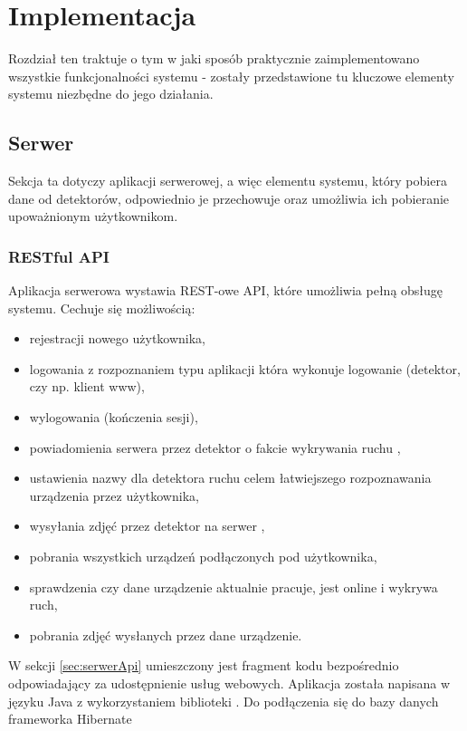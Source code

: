 \chapter{Implementacja}
\label{cha:implementacja}

Rozdział ten traktuje o tym w jaki sposób praktycznie zaimplementowano wszystkie funkcjonalności systemu - zostały przedstawione tu kluczowe elementy systemu niezbędne do jego działania. 

\section{Serwer}
\label{sec:serwer}

Sekcja ta dotyczy aplikacji serwerowej, a więc elementu systemu, który pobiera dane od detektorów, odpowiednio je przechowuje oraz umożliwia ich pobieranie upoważnionym użytkownikom.

\subsection{RESTful API}
\label{sec:api}

Aplikacja serwerowa wystawia REST-owe API, które umożliwia pełną obsługę systemu. Cechuje się możliwością:

\begin{itemize}
	\item rejestracji nowego użytkownika,
	\item logowania z rozpoznaniem typu aplikacji która wykonuje logowanie (detektor, czy np. klient www),
	\item wylogowania (kończenia sesji),
	\item powiadomienia serwera przez detektor o fakcie wykrywania ruchu ,
	\item ustawienia nazwy dla detektora ruchu celem łatwiejszego rozpoznawania urządzenia przez użytkownika,
	\item wysyłania zdjęć przez detektor na serwer ,
	\item pobrania wszystkich urządzeń podłączonych pod użytkownika,
	\item sprawdzenia czy dane urządzenie aktualnie pracuje, jest online i wykrywa ruch,
	\item pobrania zdjęć wysłanych przez dane urządzenie.
\end{itemize}


W sekcji \ref{sec:serwerApi} umieszczony jest fragment kodu bezpośrednio odpowiadający za udostępnienie usług webowych. Aplikacja została napisana w języku Java z wykorzystaniem biblioteki \cite{Jersey}. Do podłączenia się do bazy danych frameworka Hibernate \cite{Hibernate}

